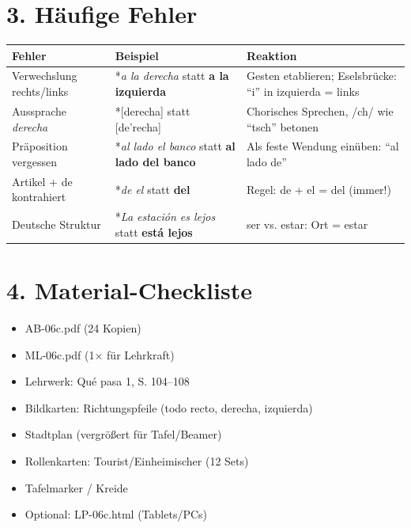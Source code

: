 \documentclass[11pt, a4paper]{article}
\newcommand{\fachfarbe}{spanisch}
\newcommand{\sequenz}{06}
\newcommand{\block}{c}
\newcommand{\lerngruppengroesse}{24}
\newcommand{\es}[1]{\textcolor{\fachfarbe}{\textbf{#1}}}
\begin{document}

\section*{3. Häufige Fehler}

\begin{fehlerbox}
\begin{tabularx}{\textwidth}{|l|X|X|}
\hline
\textbf{Fehler} & \textbf{Beispiel} & \textbf{Reaktion} \\
\hline
Verwechslung rechts/links & *\textit{a la derecha} statt \es{a la izquierda} & Gesten etablieren; Eselsbrücke: ``i'' in izquierda = links \\
\hline
Aussprache \textit{derecha} & *[derecha] statt [de'recha] & Chorisches Sprechen, /ch/ wie ``tsch'' betonen \\
\hline
Präposition vergessen & *\textit{al lado el banco} statt \es{al lado del banco} & Als feste Wendung einüben: ``al lado de'' \\
\hline
Artikel + de kontrahiert & *\textit{de el} statt \es{del} & Regel: de + el = del (immer!) \\
\hline
Deutsche Struktur & *\textit{La estación es lejos} statt \es{está lejos} & ser vs. estar: Ort = estar \\
\hline
\end{tabularx}
\end{fehlerbox}


\section*{4. Material-Checkliste}

\begin{materialbox}
\begin{itemize}[label=$\square$]
    \item AB-\sequenz\block.pdf (\lerngruppengroesse{} Kopien)
    \item ML-\sequenz\block.pdf (1× für Lehrkraft)
    \item Lehrwerk: Qué pasa 1, S. 104--108
    \item Bildkarten: Richtungspfeile (todo recto, derecha, izquierda)
    \item Stadtplan (vergrößert für Tafel/Beamer)
    \item Rollenkarten: Tourist/Einheimischer (12 Sets)
    \item Tafelmarker / Kreide
    \item Optional: LP-\sequenz\block.html (Tablets/PCs)
\end{itemize}
\end{materialbox}
\end{document}
